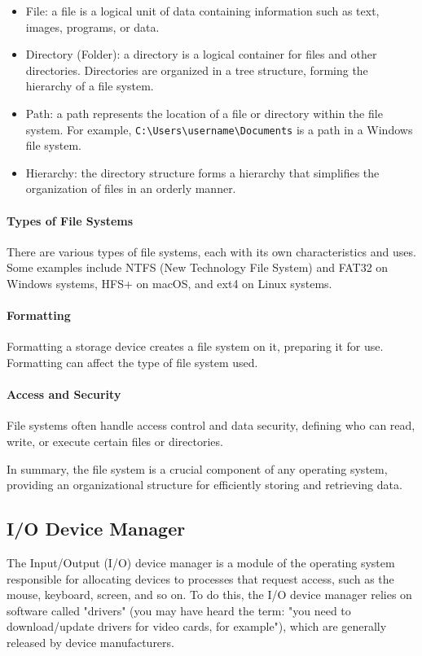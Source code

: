 \begin{itemize}
    \item File: a file is a logical unit of data containing information such as text, images, programs, or data.

    \item Directory (Folder): a directory is a logical container for files and other directories. Directories are organized in a tree structure, forming the hierarchy of a file system.

    \item Path: a path represents the location of a file or directory within the file system. For example, \texttt{C:\textbackslash Users\textbackslash username\textbackslash Documents} is a path in a Windows file system.

    \item Hierarchy: the directory structure forms a hierarchy that simplifies the organization of files in an orderly manner.
\end{itemize}

\paragraph{Types of File Systems}
There are various types of file systems, each with its own characteristics and uses. Some examples include NTFS (New Technology File System) and FAT32 on Windows systems, HFS+ on macOS, and ext4 on Linux systems.

\paragraph{Formatting}
Formatting a storage device creates a file system on it, preparing it for use. Formatting can affect the type of file system used.

\paragraph{Access and Security}
File systems often handle access control and data security, defining who can read, write, or execute certain files or directories.

In summary, the file system is a crucial component of any operating system, providing an organizational structure for efficiently storing and retrieving data.

\subsection{I/O Device Manager}
The Input/Output (I/O) device manager is a module of the operating system responsible for allocating devices to processes that request access, such as the mouse, keyboard, screen, and so on. To do this, the I/O device manager relies on software called "drivers" (you may have heard the term: "you need to download/update drivers for video cards, for example"), which are generally released by device manufacturers.

